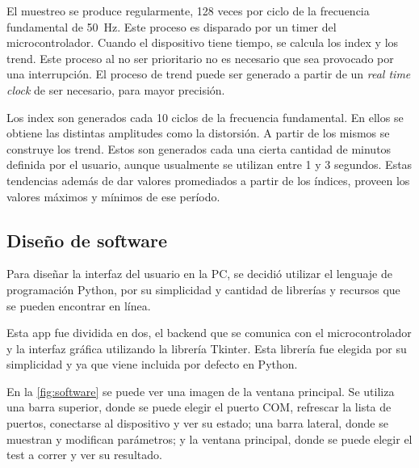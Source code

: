 \documentclass[titlepage, 12pt]{article}
\begin{document}
El muestreo se produce regularmente, 128 veces por ciclo de la frecuencia fundamental de \SI{50}{Hz}. Este proceso es disparado por un timer del microcontrolador. Cuando el dispositivo tiene tiempo, se calcula los index y los trend. Este proceso al no ser prioritario no es necesario que sea provocado por una interrupción. El proceso de trend puede ser generado a partir de un \emph{real time clock} de ser necesario, para mayor precisión.

Los index son generados cada 10 ciclos de la frecuencia fundamental. En ellos se obtiene las distintas amplitudes como la distorsión. A partir de los mismos se construye los trend. Estos son generados cada una cierta cantidad de minutos definida por el usuario, aunque usualmente se utilizan entre 1 y 3 segundos. Estas tendencias además de dar valores promediados a partir de los índices, proveen los valores máximos y mínimos de ese período.

\subsection{Diseño de software}
Para diseñar la interfaz del usuario en la PC, se decidió utilizar el lenguaje de programación Python, por su simplicidad y cantidad de librerías y recursos que se pueden encontrar en línea.

Esta app fue dividida en dos, el backend que se comunica con el microcontrolador y la interfaz gráfica utilizando la librería Tkinter. Esta librería fue elegida por su simplicidad y ya que viene incluida por defecto en Python.

En la \autoref{fig:software} se puede ver una imagen de la ventana principal. Se utiliza una barra superior, donde se puede elegir el puerto COM, refrescar la lista de puertos, conectarse al dispositivo y ver su estado; una barra lateral, donde se muestran y modifican parámetros; y la ventana principal, donde se puede elegir el test a correr y ver su resultado.
\end{document}
